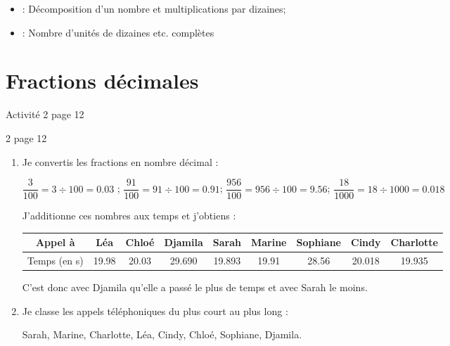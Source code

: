 \documentclass[12pt,a4paper]{article}
\begin{document}
	\begin{myexos}
		\begin{itemize}
			\item {} : Décomposition d'un nombre et multiplications par dizaines;
			\item {} : Nombre d'unités de dizaines etc. complètes
			
		\end{itemize}
	\end{myexos}
\section{Fractions décimales}

\begin{myact}{3}
	Activité 2 page 12
\end{myact}


\begin{myactrep}{2 page 12}
	\begin{enumerate}
		\item Je convertis les fractions en nombre décimal :
		
		$ \dfrac{3}{100} = 3 \div 100 = \num{0.03}$ ; $\dfrac{91}{100} = 91 \div 100 = \num{0.91}$; $\dfrac{956}{100} = 956 \div 100 = \num{9.56}$; $\dfrac{18}{1000} = 18 \div 1000 = \num{0.018}$
		
		J'additionne ces nombres aux temps et j'obtiens :
		
		\begin{tabular}{|@{\ }c@{\ }|@{\ }c@{\ }|@{\ }c@{\ }|@{\ }c@{\ }|@{\ }c@{\ }|@{\ }c@{\ }|@{\ }c@{\ }|@{\ }c@{\ }|@{\ }c@{\ }|}
			\hline
			Appel à      & Léa         & Chloé       & Djamila      & Sarah        & Marine      & Sophiane    & Cindy        & Charlotte    \\ \hline
			Temps (en s) & \num{19.98} & \num{20.03} & \num{29.690} & \num{19.893} & \num{19.91} & \num{28.56} & \num{20.018} & \num{19.935} \\ \hline
		\end{tabular}
	
	C'est donc avec Djamila qu'elle a passé le plus de temps et avec Sarah le moins.
	
		\item Je classe les appels téléphoniques du plus court au plus long :
		
		Sarah, Marine, Charlotte, Léa, Cindy, Chloé, Sophiane, Djamila.
	\end{enumerate}
\end{myactrep}
\end{document}
